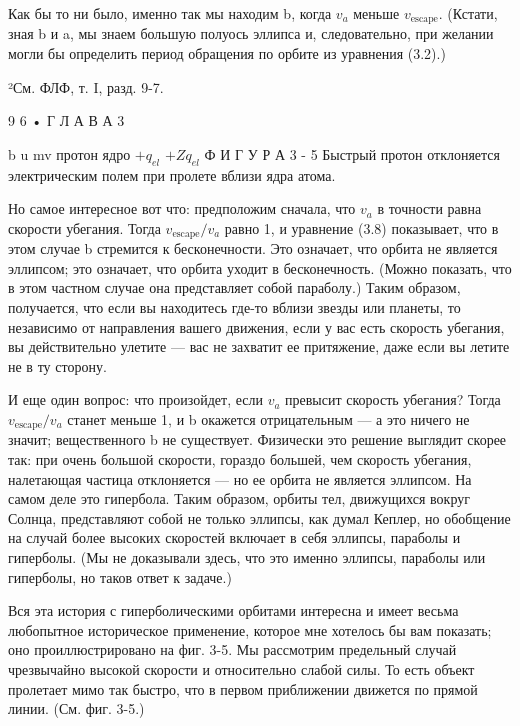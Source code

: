 \documentclass[10pt,oneside]{article}
\newcommand{\TipsSubsection}[1]{\par\vspace{6bp}{\normalsize\bfseries #1\par}\vspace{2bp}}
\begin{document}
Как бы то ни было, именно так мы находим b, когда \(v_a\) меньше \(v_{\text{escape}}\). (Кстати, зная b и a, мы знаем большую полуось эллипса и, следовательно, при желании могли бы определить период обращения по орбите из уравнения (3.2).)\par

²См. ФЛФ, т. I, разд. 9-7.\par

9 6 • Г Л А В А  3\par

b u mv протон ядро \(+q_{el}\) \(+Zq_{el}\) Ф И Г У Р А  3 - 5 Быстрый протон отклоняется электрическим полем при пролете вблизи ядра атома.\par

Но самое интересное вот что: предположим сначала, что \(v_a\) в точности равна скорости убегания. Тогда \(v_{\text{escape}}/v_a\) равно 1, и уравнение (3.8) показывает, что в этом случае b стремится к бесконечности. Это означает, что орбита не является эллипсом; это означает, что орбита уходит в бесконечность. (Можно показать, что в этом частном случае она представляет собой параболу.) Таким образом, получается, что если вы находитесь где-то вблизи звезды или планеты, то независимо от направления вашего движения, если у вас есть скорость убегания, вы действительно улетите --- вас не захватит ее притяжение, даже если вы летите не в ту сторону.\par

И еще один вопрос: что произойдет, если \(v_a\) превысит скорость убегания? Тогда \(v_{\text{escape}}/v_a\) станет меньше 1, и b окажется отрицательным --- а это ничего не значит; вещественного b не существует. Физически это решение выглядит скорее так: при очень большой скорости, гораздо большей, чем скорость убегания, налетающая частица отклоняется --- но ее орбита не является эллипсом. На самом деле это гипербола. Таким образом, орбиты тел, движущихся вокруг Солнца, представляют собой не только эллипсы, как думал Кеплер, но обобщение на случай более высоких скоростей включает в себя эллипсы, параболы и гиперболы. (Мы не доказывали здесь, что это именно эллипсы, параболы или гиперболы, но таков ответ к задаче.)\par

\TipsSubsection{3-2 Открытие атомного ядра}

Вся эта история с гиперболическими орбитами интересна и имеет весьма любопытное историческое применение, которое мне хотелось бы вам показать; оно проиллюстрировано на фиг. 3-5. Мы рассмотрим предельный случай чрезвычайно высокой скорости и относительно слабой силы. То есть объект пролетает мимо так быстро, что в первом приближении движется по прямой линии. (См. фиг. 3-5.)\par
\end{document}
